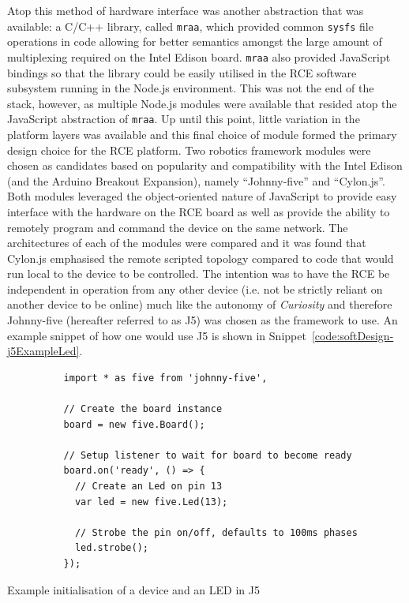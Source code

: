       Atop this method of hardware interface was another abstraction that was available: a C/C++ library, called \texttt{mraa}, which provided common \texttt{sysfs} file operations in code allowing for better semantics amongst the large amount of multiplexing required on the Intel Edison board. \texttt{mraa} also provided JavaScript bindings so that the library could be easily utilised in the RCE software subsystem running in the Node.js environment. This was not the end of the stack, however, as multiple Node.js modules were available that resided atop the JavaScript abstraction of \texttt{mraa}. Up until this point, little variation in the platform layers was available and this final choice of module formed the primary design choice for the RCE platform. Two robotics framework modules were chosen as candidates based on popularity and compatibility with the Intel Edison (and the Arduino Breakout Expansion), namely ``Johnny-five'' and ``Cylon.js''. Both modules leveraged the object-oriented nature of JavaScript to provide easy interface with the hardware on the RCE board as well as provide the ability to remotely program and command the device on the same network. The architectures of each of the modules were compared and it was found that Cylon.js emphasised the remote scripted topology compared to code that would run local to the device to be controlled. The intention was to have the RCE be independent in operation from any other device (i.e. not be strictly reliant on another device to be online) much like the autonomy of \textit{Curiosity} and therefore Johnny-five (hereafter referred to as J5) was chosen as the framework to use. An example snippet of how one would use J5 is shown in Snippet~\ref{code:softDesign-j5ExampleLed}.
      
      \begin{code}
        \begin{verbatim}
          import * as five from 'johnny-five',
          
          // Create the board instance
          board = new five.Board();
          
          // Setup listener to wait for board to become ready
          board.on('ready', () => {
            // Create an Led on pin 13
            var led = new five.Led(13);
          
            // Strobe the pin on/off, defaults to 100ms phases
            led.strobe();
          });
        \end{verbatim}
        \caption{Example initialisation of a device and an LED in J5}
        \label{code:softDesign-j5ExampleLed}
      \end{code}
      
